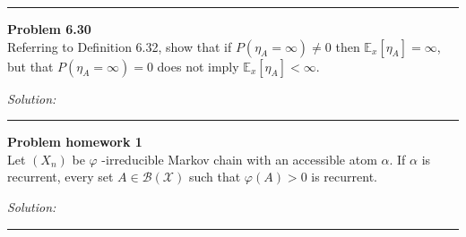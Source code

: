 \documentclass[a4paper, 11pt]{article}
\newenvironment{problem}[2][Problem]
    { \begin{mdframed}[backgroundcolor=gray!20] \textbf{#1 #2} \\}
    {  \end{mdframed}}
\newenvironment{solution}
    {\textit{Solution:}}
    {}
\begin{document}
\noindent\rule{7in}{2.8pt}
\begin{problem}{6.30}
Referring to Definition 6.32, show that if $P\left(\eta_{A}=\infty\right) \neq 0$ then $\mathbb{E}_{x}\left[\eta_{A}\right]=\infty$,
but that $P\left(\eta_{A}=\infty\right)=0$ does not imply $\mathbb{E}_{x}\left[\eta_{A}\right]<\infty$.
\end{problem}
\begin{solution}

\end{solution}

\noindent\rule{7in}{2.8pt}
\begin{problem}{homework 1}
Let $\left(X_{n}\right)$ be $\varphi$ -irreducible Markov chain with an accessible atom $\alpha$.
If $\alpha$ is recurrent, every set $A \in \mathscr{B}(\mathscr{X})$ such that $\varphi(A)>0$ is recurrent.
\end{problem}
\begin{solution}
    
\end{solution}
    
\noindent\rule{7in}{2.8pt}
\end{document}
